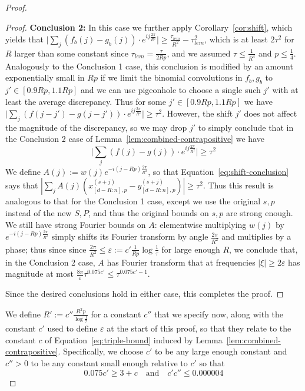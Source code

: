 \documentclass[11pt]{article}
\theoremstyle{plain}
\newcommand{\eps}{\varepsilon}
\begin{document}
\begin{proof}
\begin{proof}
    \noindent \textbf{Conclusion 2:} In this case we further apply Corollary~\ref{cor:shift}, which yields that $\big|\sum_{j} (f_b(j)-g_b(j))\cdot e^{ij\frac{2\pi}{R^2}}\big|\geq \frac{\tau_{lem}}{R^2}-\tau_{lem}^2$, which is at least $2\tau^2$ for $R$ larger than some constant since $\tau_{lem}=\frac{\tau}{2Rp}$, and we assumed $\tau\leq \frac{1}{R^4}$ and $p\leq \frac{1}{4}$. 
    Analogously to the Conclusion 1 case, this conclusion is modified by an amount exponentially small in $Rp$ if we limit the binomial convolutions in $f_b,g_b$ to $j'\in[0.9Rp,1.1Rp]$ and we can use pigeonhole to choose a single such $j'$ with at least the average discrepancy. Thus for some $j'\in[0.9Rp,1.1Rp]$ we have $\big|\sum_{j} (f(j-j')-g(j-j'))\cdot e^{ij\frac{2\pi}{R^2}}\big|\geq \tau^2$. However, the shift $j'$ does not affect the magnitude of the discrepancy, so we may drop $j'$ to simply conclude that in the Conclusion 2 case of Lemma~\ref{lem:combined-contrapositive} we have \begin{equation}\label{eq:shift-conclusion}\big|\sum_{j} (f(j)-g(j))\cdot e^{ij\frac{2\pi}{R^2}}\big|\geq \tau^2\end{equation}
    We define $A(j):=w(j) e^{-i(j-Rp)\frac{2\pi}{R^2}}$, so that Equation~\ref{eq:shift-conclusion} says that $|\sum_j A(j)(x_{[d-R:n],p}^{(s+j)}-y_{[d-R:n],p}^{(s+j)})|\geq \tau^2$. Thus this result is analogous to that for the Conclusion 1 case, except we use the original $s,p$ instead of the new $S,P$, and thus the original bounds on $s,p$ are strong enough. We still have strong Fourier bounds on $A$: elementwise multiplying $w(j)$ by $e^{-i(j-Rp)\frac{2\pi}{R^2}}$ simply shifts its Fourier transform by angle $\frac{2\pi}{R^2}$ and multiplies by a phase; thus since since $\frac{2\pi}{R^2}\leq \eps:=c'\frac{1}{Rp}\log\frac{1}{\tau}$ for large enough $R$, we conclude that, in the Conclusion 2 case, $A$ has Fourier transform that at frequencies $|\xi|\geq 2\eps$ has magnitude at most $\frac{8\pi}{\eps} \tau^{0.075 c'} \leq \tau^{0.075 c' - 1}$. 

    Since the desired conclusions hold in either case, this completes the proof.
\end{proof}

We define $R':=c''\frac{R^2 p}{\log\frac{1}{\tau}}$ for a constant $c''$ that we specify now, along with the constant $c'$ used to define $\eps$ at the start of this proof, so that they relate to the constant $c$ of Equation~\ref{eq:triple-bound} induced by Lemma~\ref{lem:combined-contrapositive}. Specifically, we choose $c'$ to be any large enough constant and $c''>0$ to be any constant small enough relative to $c'$ so that
\begin{equation}\label{eq:constants}
0.075c'\geq 3+c\quad \textrm{and}\quad c'c''\leq 0.000004
\end{equation}


\end{proof}
\end{document}
